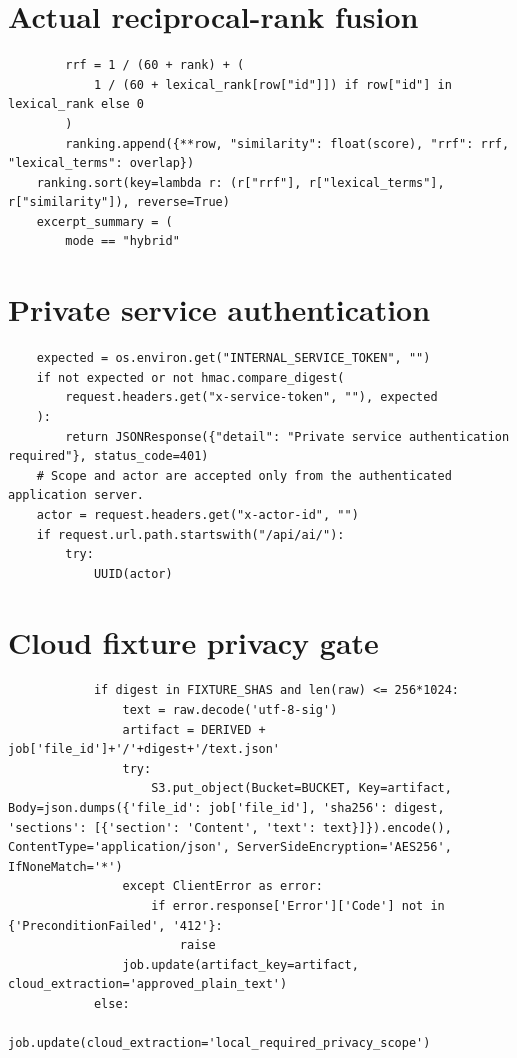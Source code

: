 \newpage
\section{Actual reciprocal-rank fusion}
\begin{lstlisting}
        rrf = 1 / (60 + rank) + (
            1 / (60 + lexical_rank[row["id"]]) if row["id"] in lexical_rank else 0
        )
        ranking.append({**row, "similarity": float(score), "rrf": rrf, "lexical_terms": overlap})
    ranking.sort(key=lambda r: (r["rrf"], r["lexical_terms"], r["similarity"]), reverse=True)
    excerpt_summary = (
        mode == "hybrid"
\end{lstlisting}

\section{Private service authentication}
\begin{lstlisting}
    expected = os.environ.get("INTERNAL_SERVICE_TOKEN", "")
    if not expected or not hmac.compare_digest(
        request.headers.get("x-service-token", ""), expected
    ):
        return JSONResponse({"detail": "Private service authentication required"}, status_code=401)
    # Scope and actor are accepted only from the authenticated application server.
    actor = request.headers.get("x-actor-id", "")
    if request.url.path.startswith("/api/ai/"):
        try:
            UUID(actor)
\end{lstlisting}

\section{Cloud fixture privacy gate}
\begin{lstlisting}
            if digest in FIXTURE_SHAS and len(raw) <= 256*1024:
                text = raw.decode('utf-8-sig')
                artifact = DERIVED + job['file_id']+'/'+digest+'/text.json'
                try:
                    S3.put_object(Bucket=BUCKET, Key=artifact, Body=json.dumps({'file_id': job['file_id'], 'sha256': digest, 'sections': [{'section': 'Content', 'text': text}]}).encode(), ContentType='application/json', ServerSideEncryption='AES256', IfNoneMatch='*')
                except ClientError as error:
                    if error.response['Error']['Code'] not in {'PreconditionFailed', '412'}:
                        raise
                job.update(artifact_key=artifact, cloud_extraction='approved_plain_text')
            else:
                job.update(cloud_extraction='local_required_privacy_scope')
\end{lstlisting}

